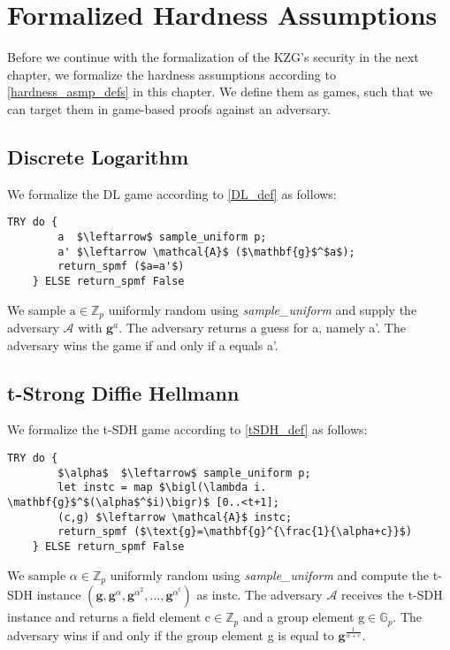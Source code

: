 \chapter{Formalized Hardness Assumptions}\label{chapter:hardness_asmps_frml}
Before we continue with the formalization of the KZG's security in the next chapter, we formalize the hardness assumptions according to \ref{hardness_asmp_defs} in this chapter. We define them as games, such that we can target them in game-based proofs against an adversary.

\section*{Discrete Logarithm}
We formalize the DL game according to \ref{DL_def} as follows: 
\begin{lstlisting}[language=isabelle]
    TRY do {
        a  $\leftarrow$ sample_uniform p;
        a' $\leftarrow \mathcal{A}$ ($\mathbf{g}$^$a$);
        return_spmf ($a=a'$)
    } ELSE return_spmf False
\end{lstlisting}
We sample $\text{a} \in \mathbb{Z}_p$ uniformly random using \textit{sample\_uniform} and supply the adversary $\mathcal{A}$ with $\mathbf{g}^a$. The adversary returns a guess for a, namely a'. The adversary wins the game if and only if a equals a'.

\section*{t-Strong Diffie Hellmann}
We formalize the t-SDH game according to \ref{tSDH_def} as follows: 
\begin{lstlisting}[language=isabelle]
    TRY do {
        $\alpha$  $\leftarrow$ sample_uniform p;
        let instc = map $\bigl(\lambda i. \mathbf{g}$^$(\alpha$^$i)\bigr)$ [0..<t+1];
        (c,g) $\leftarrow \mathcal{A}$ instc;
        return_spmf ($\text{g}=\mathbf{g}^{\frac{1}{\alpha+c}}$)
    } ELSE return_spmf False
\end{lstlisting}
We sample $\alpha\in\mathbb{Z}_p$ uniformly random using \textit{sample\_uniform} and compute the t-SDH instance $(\mathbf{g}, \mathbf{g}^{\alpha}, \mathbf{g}^{\alpha^2}, \dots, \mathbf{g}^{\alpha^t})$ as instc. The adversary $\mathcal{A}$ receives the t-SDH instance and returns a field element $\text{c}\in\mathbb{Z}_p$ and a group element $\text{g}\in\mathbb{G}_p$. The adversary wins if and only if the group element g is equal to $\mathbf{g}^{\frac{1}{\alpha+c}}$.

